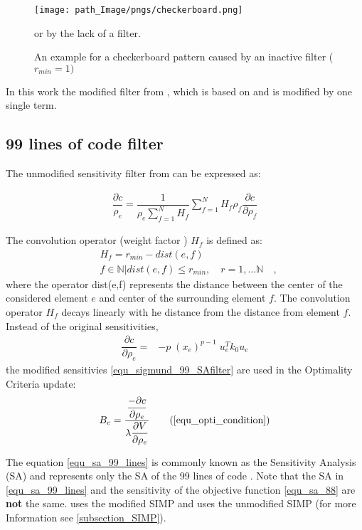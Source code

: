  \begin{figure}[!h]
	\centering
 \texttt{[image: path\_Image/pngs/checkerboard.png]}
	\caption{An example for a checkerboard pattern caused by an inactive filter ($r_{min} = 1)$} or by the lack of a filter.
	\label{fig_checkerboard}
	\end{figure}
	\vspace{0.7 cm}

 
 In this work the modified filter from \cite{Andreassen.2011}, which is based on \cite{Sigmund.2001} and is modified by one single term.
\subsection{99 lines of code filter} 
\label{subsection_99_lines_of_code}
 The unmodified sensitivity filter from \cite{Sigmund.2001} can be expressed as:
 
 \begin{align}
 \dfrac{\partial c}{\rho_e} = \dfrac{1}{\rho_e \displaystyle\sum_{f=1}^{N}H_f}\sum_{f=1}^{N}H_f \rho_f\dfrac{\partial c}{\partial \rho_f}
 \label{equ_sigmund_99_SAfilter}
 \end{align}
 
The convolution operator (weight factor ) \textbf{$H_f$} is defined as:
\begin{align}
&H_f = r_{min} - dist(e,f) 
\label{equ_convultion_99} \\ \nonumber
&f \in \mathbb{N} \vert dist(e,f) \leq r_{min},\quad r= 1,...\mathbb{N} \quad ,
\end{align}
where the operator dist(e,f) represents the distance between the center of the considered element \textbf{$e$} and center of the surrounding element \textbf{$f$}. The convolution operator \textbf{$H_f$} decays linearly with he distance from the distance from element \textbf{$f$}. Instead of the original sensitivities, 
\begin{align}
\dfrac{\partial c}{\partial \rho_e} =& -p \;(x_e)  ^{p-1} \;u_e^Tk_0u_e
\label{equ_sa_99_lines}
\end{align}
the modified sensitivies \eqref{equ_sigmund_99_SAfilter} are used in the Optimality Criteria update:
\begin{align}
B_e = \dfrac{\dfrac{-\partial c}{\partial \rho_e}}{\displaystyle\lambda \dfrac{\partial V}{\partial\rho_e}}
\tag{\ref{equ_opti_condition}}
\end{align}

The equation \eqref{equ_sa_99_lines} is commonly known as the Sensitivity Analysis (SA) and represents only the SA of the 99 lines of code \cite{Sigmund.2001}. Note that the SA in \cite{Sigmund.2001}\eqref{equ_sa_99_lines} and the sensitivity of the objective function \cite{Andreassen.2011} \eqref{equ_sa_88} are \textbf{not} the same. \cite{Andreassen.2011} uses the modified SIMP and \cite{Sigmund.2001} uses the unmodified SIMP (for more Information see \ref{subsection_SIMP}).

